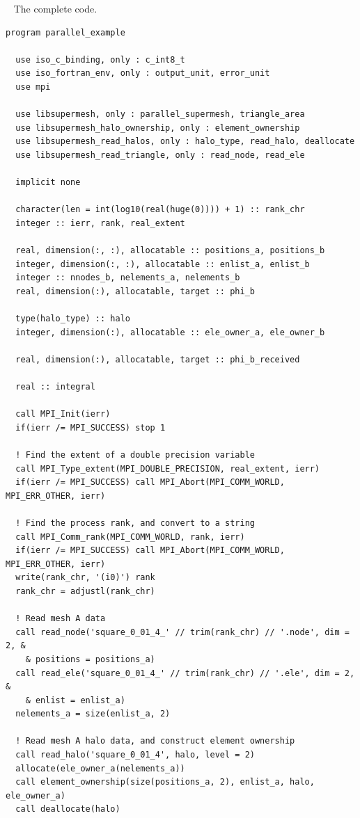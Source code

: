 \documentclass{article}
\begin{document}
~\newline
The complete code.
\begin{lstlisting}[language=FORTRAN]
program parallel_example

  use iso_c_binding, only : c_int8_t
  use iso_fortran_env, only : output_unit, error_unit
  use mpi
  
  use libsupermesh, only : parallel_supermesh, triangle_area
  use libsupermesh_halo_ownership, only : element_ownership
  use libsupermesh_read_halos, only : halo_type, read_halo, deallocate
  use libsupermesh_read_triangle, only : read_node, read_ele

  implicit none
  
  character(len = int(log10(real(huge(0)))) + 1) :: rank_chr
  integer :: ierr, rank, real_extent
  
  real, dimension(:, :), allocatable :: positions_a, positions_b
  integer, dimension(:, :), allocatable :: enlist_a, enlist_b
  integer :: nnodes_b, nelements_a, nelements_b
  real, dimension(:), allocatable, target :: phi_b
  
  type(halo_type) :: halo
  integer, dimension(:), allocatable :: ele_owner_a, ele_owner_b
  
  real, dimension(:), allocatable, target :: phi_b_received
  
  real :: integral
  
  call MPI_Init(ierr)
  if(ierr /= MPI_SUCCESS) stop 1
  
  ! Find the extent of a double precision variable
  call MPI_Type_extent(MPI_DOUBLE_PRECISION, real_extent, ierr)
  if(ierr /= MPI_SUCCESS) call MPI_Abort(MPI_COMM_WORLD, MPI_ERR_OTHER, ierr)
  
  ! Find the process rank, and convert to a string
  call MPI_Comm_rank(MPI_COMM_WORLD, rank, ierr)
  if(ierr /= MPI_SUCCESS) call MPI_Abort(MPI_COMM_WORLD, MPI_ERR_OTHER, ierr)
  write(rank_chr, '(i0)') rank
  rank_chr = adjustl(rank_chr)
  
  ! Read mesh A data
  call read_node('square_0_01_4_' // trim(rank_chr) // '.node', dim = 2, &
    & positions = positions_a)
  call read_ele('square_0_01_4_' // trim(rank_chr) // '.ele', dim = 2, &
    & enlist = enlist_a)
  nelements_a = size(enlist_a, 2)
    
  ! Read mesh A halo data, and construct element ownership
  call read_halo('square_0_01_4', halo, level = 2)
  allocate(ele_owner_a(nelements_a))
  call element_ownership(size(positions_a, 2), enlist_a, halo, ele_owner_a)
  call deallocate(halo)
    

\end{lstlisting}
\end{document}
